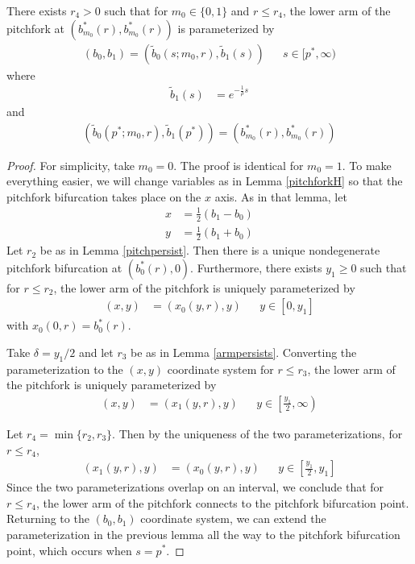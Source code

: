 \documentclass[thesis.tex]{subfiles}
\begin{document}
\begin{lemma}\label{pitchforkconnects}
There exists $r_4 > 0$ such that for $m_0 \in \{0, 1\}$ and $r \leq r_4$, the lower arm of the pitchfork at $(b_{m_0}^*(r), b_{m_0}^*(r))$ is parameterized by
\begin{align*}
(b_0, b_1) = (\tilde{b}_0(s; m_0, r), \tilde{b}_1(s)) && s \in [p^*, \infty)
\end{align*}
where
\begin{align*}
\tilde{b}_1(s) &= e^{-\frac{1}{\rho}s} 
\end{align*}
and 
\begin{align*}
(\tilde{b}_0(p^*; m_0, r), \tilde{b}_1(p^*)) = (b_{m_0}^*(r), b_{m_0}^*(r))
\end{align*}

\begin{proof}
For simplicity, take $m_0 = 0$. The proof is identical for $m_0 = 1$. To make everything easier, we will change variables as in Lemma \ref{pitchforkH} so that the pitchfork bifurcation takes place on the $x$ axis. As in that lemma, let 
\begin{align*}
x &= \frac{1}{2}(b_1 - b_0) \\
y &= \frac{1}{2}(b_1 + b_0)
\end{align*}
Let $r_2$ be as in Lemma \ref{pitchpersist}. Then there is a unique nondegenerate pitchfork bifurcation at $(b_0^*(r), 0)$. Furthermore, there exists $y_1 \geq 0$ such that for $r \leq r_2$, the lower arm of the pitchfork is uniquely parameterized by
\begin{align*}
(x, y) &= (x_0(y, r), y) && y \in [0, y_1]
\end{align*}
with $x_0(0, r) = b_0^*(r)$.

Take $\delta = y_1/2$ and let $r_3$ be as in Lemma \ref{armpersists}. Converting the parameterization to the $(x, y)$ coordinate system for $r \leq r_3$, the lower arm of the pitchfork is uniquely parameterized by 
\begin{align*}
(x, y) &= (x_1(y, r), y) && y \in \left[\frac{y_1}{2}, \infty \right)
\end{align*}

Let $r_4 = \min\{ r_2, r_3 \}$. Then by the uniqueness of the two parameterizations, for $r \leq r_4$,
\begin{align*}
(x_1(y, r), y) &= (x_0(y, r), y) && y \in \left[\frac{y_1}{2}, y_1\right]
\end{align*}
Since the two parameterizations overlap on an interval, we conclude that for $r \leq r_4$, the lower arm of the pitchfork connects to the pitchfork bifurcation point. Returning to the $(b_0, b_1)$ coordinate system, we can extend the parameterization in the previous lemma all the way to the pitchfork bifurcation point, which occurs when $s = p^*$.

\end{proof}
\end{lemma}
\end{document}

